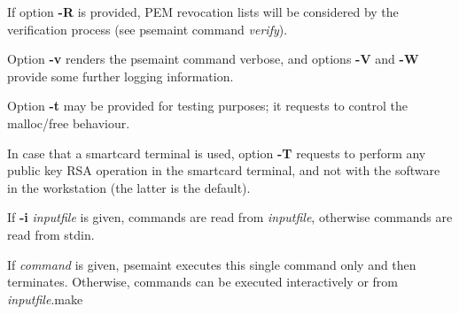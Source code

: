 If option {\bf -R} is provided, PEM revocation lists will be considered by the verification process
(see psemaint command {\em verify}).

Option {\bf -v} renders the psemaint command verbose, and options {\bf -V} and {\bf -W} provide some further
logging information. 

Option {\bf -t} may be provided for testing purposes; it requests to control 
the malloc/free behaviour.

In case that a smartcard terminal is used, option {\bf -T} requests to perform any public key 
RSA operation in the smartcard terminal, and not with the software in the workstation 
(the latter is the default).

If {\bf -i} {\em inputfile} is given, commands are read from {\em inputfile}, otherwise
commands are read from stdin.

If {\em command} is given, psemaint executes this single command only and then terminates. 
Otherwise, commands can be executed interactively or from {\em inputfile}.make  

